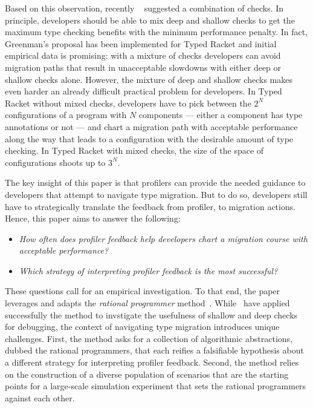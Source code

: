  Based on this observation, recently
 ~\citet{g-thesis-2020,g-deep-shallow} suggested a combination of checks.
 In principle, developers should be able to mix deep and shallow checks
 to get the maximum type checking benefits with the minimum performance
 penalty.  In fact, Greenman's proposal has been implemented for Typed
 Racket and initial empirical data is promising: with a mixture of checks
 developers can avoid migration paths that result in unacceptable
 slowdowns with either deep or shallow checks alone.  However, the mixture
 of deep and shallow checks makes even harder an already difficult
 practical problem for developers.  In Typed Racket without mixed checks,
 developers have to pick  between the $2^N$ configurations of a program
 with $N$ components --- either a component has type annotations or not
 --- and chart a migration path with acceptable performance along the way
 that leads to a configuration with the desirable amount of type checking.
 In Typed Racket with mixed checks, the size of the space of
 configurations shoots up to $3^N$.

The key insight of this paper is that profilers can provide the needed guidance to
developers that attempt to navigate type migration.
But to do so, developers still have to strategically 
translate the feedback from profiler, to migration actions. 
Hence, this paper aims to answer the following: 
\begin{itemize}
  \item    
    {\em How often does profiler feedback help developers
    chart a migration course with acceptable performance?} 
  \item
   {\em Which strategy of interpreting profiler feedback is the most
    successful?}
\end{itemize}   

These questions call for an empirical investigation. To that end, the paper
leverages and adapts the \emph{rational programmer}
method~\cite{lksfd-popl-2020,lgfd-icfp-2021}.
While~\citet{lgfd-icfp-2021} have applied successfully the method
to invstigate the usefulness of shallow and deep checks for
debugging, the context of navigating type migration introduces unique
challenges. First, the method asks for a collection of algorithmic
abstractions, dubbed the rational programmers, that each reifies a
falsifiable hypothesis about a different strategy for interpreting profiler
feedback.  Second, the method relies on the construction of a diverse
population of scenarios that are the starting points for a large-scale
simulation experiment that sets the rational programmers against each
other.   

